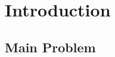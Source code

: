 \documentclass[12pt,twoside]{article}
\begin{document}


\newpage

\tableofcontents

\newpage

\section{Introduction}
\subsection{Main Problem}
\end{document}
